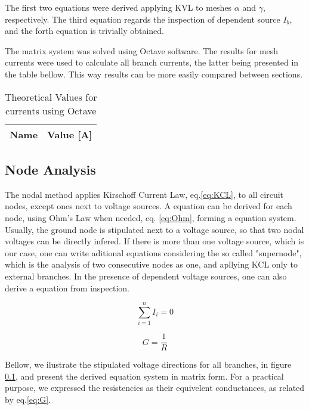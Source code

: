 \par The first two equations were derived applying KVL to meshes $\alpha$ and $\gamma$, respectively. The third equation regards the inspection of dependent source $I_b$, and the forth equation is trivially obtained.

\par The matrix system was solved using Octave software. The results for mesh currents were used to calculate all branch currents, the latter being presented in the table bellow. This way results can be more easily compared between sections.



\begin{table}[H]
  \centering
  \begin{tabular}{|l|r|}
    \hline
    {\bf Name} & {\bf Value [A]} \\ \hline
    
  \end{tabular}
  \caption{Theoretical Values for currents using Octave}
  \label{tab:TCurrents}
\end{table}

\subsection{Node Analysis}
\par The nodal method applies Kirschoff Current Law, eq.\ref{eq:KCL}, to all circuit nodes, except ones next to voltage sources. A equation can be derived for each node, using Ohm's Law when needed, eq. \ref{eq:Ohm}, forming a equation system. Usually, the ground node is stipulated next to a voltage source, so that two nodal voltages can be directly infered. If there is more than one voltage source, which is our case, one can write aditional equations considering the so called "supernode", which is the analysis of two consecutive nodes as one, and apllying KCL only to external branches. In the presence of dependent voltage sources, one can also derive a equation from inspection. 
\begin{multicols}{2}
\begin{equation}
    \sum_{i=1}^{n} I_i = 0
    \label{eq:KCL}
\end{equation}

\begin{equation}
    G = \frac{1}{R}
    \label{eq:G}
\end{equation}
\end{multicols}

Bellow, we ilustrate the stipulated voltage directions for all branches, in figure \ref{}, and present the derived equation system in matrix form. For a practical purpose, we expressed the resistencies as their equivelent conductances, as related by eq.\ref{eq:G}.

